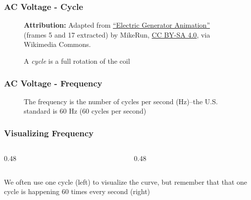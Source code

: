 \begin{frame}
    \frametitle{AC Voltage - Cycle}

    \begin{figure}
        \centering
        \resizebox{0.48\linewidth}{!}{
            
        }

        {\tiny \textbf{Attribution:} Adapted from \href{https://commons.wikimedia.org/wiki/File:Electric-generator-animation.gif}{``Electric Generator Animation''} (frames 5 and 17 extracted) by MikeRun, \href{https://creativecommons.org/licenses/by-sa/4.0}{CC BY-SA 4.0}, via Wikimedia Commons.\\[0.5em]}

        {\footnotesize A \emph{cycle} is a full rotation of the coil\par}

    \end{figure}

\end{frame}

\begin{frame}
    \frametitle{AC Voltage - Frequency}

    \begin{figure}
        \centering
        \resizebox{0.75\linewidth}{!}{
            
        }

        {\footnotesize The frequency is the number of cycles per second (Hz)--the U.S. standard is 60 Hz (60 cycles per second)\par}

    \end{figure}

\end{frame}

\begin{frame}
    \frametitle{Visualizing Frequency}
    \begin{columns}
        \begin{column}{0.48\linewidth}
            \begin{figure}
                \centering
                \resizebox{\columnwidth}{!}{
                    
                }
            \end{figure}
        \end{column}
        \begin{column}{0.48\linewidth}
            \begin{figure}
                \centering
                \resizebox{\columnwidth}{!}{
                    
                }
            \end{figure}
        \end{column}
    \end{columns}
    \centering
    {\footnotesize We often use one cycle (left) to visualize the curve, but remember that that one cycle is happening 60 times every second (right)\par}
\end{frame}

